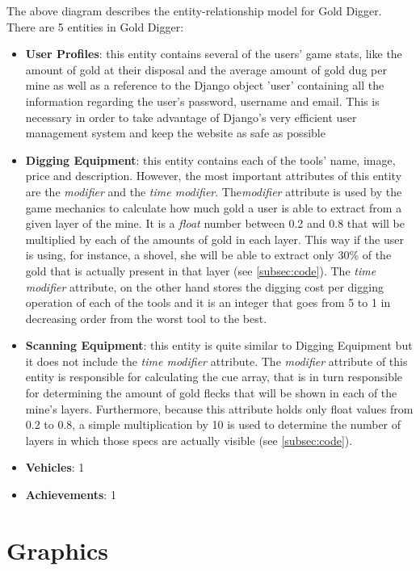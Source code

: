 \documentclass{mproj}
\begin{document}
The above diagram describes the entity-relationship model for Gold Digger. There are 5 entities in Gold Digger:
\begin{itemize}
	\item \textbf{User Profiles}: this entity contains several of the users' game stats, like the amount of gold at their disposal and the average amount of gold dug per mine as well as a reference to the Django object 'user' containing all the information regarding the user's password, username and email. This is necessary in order to take advantage of Django's very efficient user management system and keep the website as safe as possible 
  	\item \textbf{Digging Equipment}: this entity contains each of the tools' name, image, price and description. However, the most important attributes of this entity are the \textit{modifier} and the \textit{time modifier}. The\textit{modifier} attribute is used by the game mechanics to calculate how much gold a user is able to extract from a given layer of the mine. It is a \textit{float} number between 0.2 and 0.8  that will be multiplied by each of the amounts of gold in each layer. This way if the user is using, for instance, a shovel, she will be able to extract only 30\% of the gold that is actually present in that layer (see \ref{subsec:code}). The \textit{time modifier} attribute, on the other hand stores the digging cost per digging operation of each of the tools and it is an integer that goes from 5 to 1 in decreasing order from the worst tool to the best.
  	\item \textbf{Scanning Equipment}: this entity is quite similar to Digging Equipment but it does not include the \textit{time modifier} attribute. The \textit{modifier} attribute of this entity is responsible for calculating the cue array, that is in turn responsible for determining the amount of gold flecks that will be shown in each of the mine's layers. Furthermore, because this attribute holds only float values from 0.2 to 0.8, a simple multiplication by 10 is used  to determine the number of layers in which those specs are actually visible  (see \ref{subsec:code}).
	\item \textbf{Vehicles}: 1
	\item \textbf{Achievements}: 1
\end{itemize} 

\section{Graphics}
\end{document}
